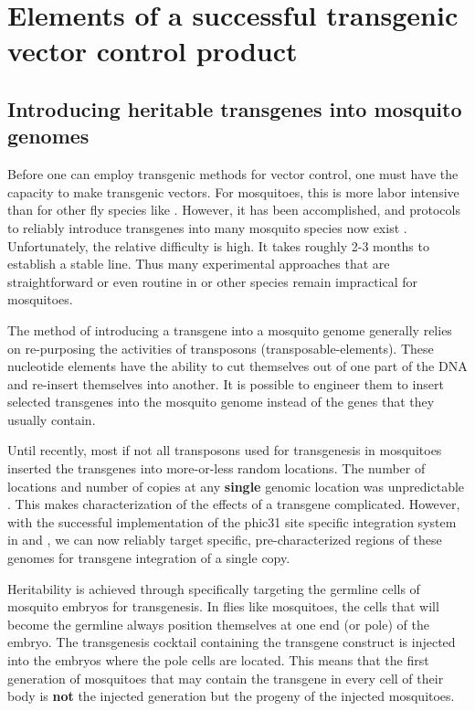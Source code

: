 \section{Elements of a successful transgenic vector control product}
\dummytext

\subsection{Introducing heritable transgenes into mosquito genomes}

Before one can employ transgenic methods for vector control, one must have the capacity to make transgenic vectors.
For mosquitoes, this is more labor intensive than for other fly species like \Dmel.
However, it has been accomplished, and protocols to reliably introduce transgenes into many mosquito species now exist \CITEME.
Unfortunately, the relative difficulty is high.
It takes roughly 2-3 months to establish a stable line.
Thus many experimental approaches that are straightforward or even routine in \Dm or other species remain impractical for mosquitoes.

The method of introducing a \gls{transgene} into a mosquito genome generally relies on re-purposing the activities of \glspl{transposon} (\glspl{transposable-element}).
These nucleotide elements have the ability to cut themselves out of one part of the DNA and re-insert themselves into another.
It is possible to engineer them to insert selected transgenes into the mosquito genome instead of the genes that they usually contain.


Until recently, most if not all transposons used for transgenesis in mosquitoes inserted the transgenes into more-or-less random locations.
The number of locations and number of copies at any \textbf{single} genomic location was unpredictable \cite{Adelman2004,Sethuraman2007}.
This makes characterization of the effects of a transgene complicated.
However, with the successful implementation of the \gls{phic31} site specific integration system in \Aa and \As \cite{Thorpe1998,Nimmo2006,Isaacs2012}, we can now reliably target specific, pre-characterized regions of these genomes for transgene integration of a single copy.

Heritability is achieved through specifically targeting the \gls{germline} cells of mosquito embryos for transgenesis.
In flies like mosquitoes, the cells that will become the germline always position themselves at one end (or pole) of the embryo.
The transgenesis cocktail containing the transgene construct is injected into the embryos where the pole cells are located.
This means that the first generation of mosquitoes that may contain the transgene in every cell of their body is \textbf{not} the injected generation but the progeny of the injected mosquitoes.

